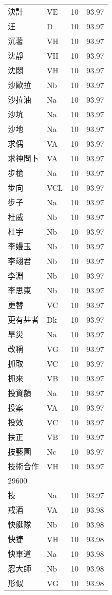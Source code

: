 \documentclass[twocolumn]{book}
\begin{document}
\begin{supertabular}{llrr}
決計 & VE & 10 &  93.97\\
汪 & D & 10 &  93.97\\
沉著 & VH & 10 &  93.97\\
沈靜 & VH & 10 &  93.97\\
沈悶 & VH & 10 &  93.97\\
沙歐拉 & Nb & 10 &  93.97\\
沙拉油 & Na & 10 &  93.97\\
沙坑 & Na & 10 &  93.97\\
沙地 & Na & 10 &  93.97\\
求偶 & VA & 10 &  93.97\\
求神問卜 & VA & 10 &  93.97\\
步槍 & Na & 10 &  93.97\\
步向 & VCL & 10 &  93.97\\
步子 & Na & 10 &  93.97\\
杜威 & Nb & 10 &  93.97\\
杜宇 & Nb & 10 &  93.97\\
李嫚玉 & Nb & 10 &  93.97\\
李翊君 & Nb & 10 &  93.97\\
李淵 & Nb & 10 &  93.97\\
李思東 & Nb & 10 &  93.97\\
更替 & VC & 10 &  93.97\\
更有甚者 & Dk & 10 &  93.97\\
旱災 & Na & 10 &  93.97\\
改稱 & VG & 10 &  93.97\\
抓取 & VC & 10 &  93.97\\
抓來 & VB & 10 &  93.97\\
投資額 & Na & 10 &  93.97\\
投案 & VA & 10 &  93.97\\
投效 & VC & 10 &  93.97\\
扶正 & VB & 10 &  93.97\\
技藝園 & Nc & 10 &  93.97\\
技術合作 & VH & 10 &  93.97\\
29600\\
技 & Na & 10 &  93.97\\
戒酒 & VA & 10 &  93.98\\
快艇隊 & Nb & 10 &  93.98\\
快捷 & VH & 10 &  93.98\\
快車道 & Na & 10 &  93.98\\
忍大師 & Nb & 10 &  93.98\\
形似 & VG & 10 &  93.98\\

\end{supertabular}
\end{document}
